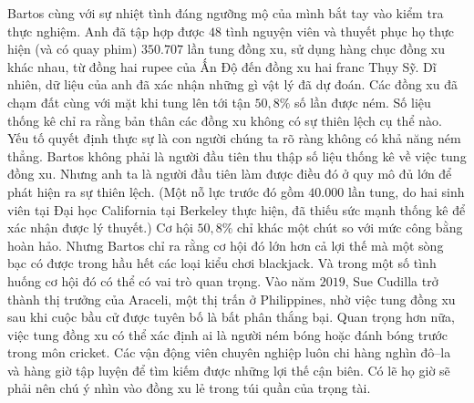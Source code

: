 \begin{multicols}{2}
	\vskip 0.1cm
	Bartos cùng với sự nhiệt tình đáng ngưỡng mộ của mình bắt tay vào kiểm tra thực nghiệm. Anh đã tập hợp được $48$ tình nguyện viên và thuyết phục họ thực hiện (và có quay phim) $350{.}707$ lần tung đồng xu, sử dụng hàng chục đồng xu khác nhau, từ đồng hai rupee của Ấn Độ đến đồng xu hai franc Thụy Sỹ. Dĩ nhiên, dữ liệu của anh  đã xác nhận những gì vật lý đã dự đoán. Các đồng xu đã chạm đất cùng với mặt khi tung lên tới tận $50,8\%$ số lần được ném.
	\vskip 0.1cm
	Số liệu thống kê chỉ ra rằng bản thân các đồng xu không có sự thiên lệch cụ thể nào. Yếu tố quyết định thực sự là con người chúng ta rõ ràng không có khả năng ném thẳng.  Bartos không phải là người đầu tiên thu thập số liệu thống kê về việc tung đồng xu. Nhưng anh ta là người đầu tiên làm được điều đó ở quy mô đủ lớn để phát hiện ra sự thiên lệch. (Một nỗ lực trước đó gồm $40{.}000$ lần tung, do hai sinh viên tại Đại học California tại Berkeley  thực hiện, đã thiếu sức mạnh thống kê để xác nhận được  lý thuyết.)
	\vskip 0.1cm
	Cơ hội $50,8\%$ chỉ khác một chút so với mức công bằng hoàn hảo. Nhưng  Bartos chỉ ra rằng cơ hội đó lớn hơn cả  lợi thế mà một sòng bạc có được trong hầu hết các loại kiểu chơi blackjack. Và trong một số tình huống cơ hội đó có thể có vai trò quan trọng. Vào năm $2019$, Sue Cudilla trở thành thị trưởng của Araceli, một thị trấn ở Philippines, nhờ việc tung đồng xu sau khi cuộc bầu cử được tuyên bố là bất phân thắng bại. Quan trọng hơn nữa, việc tung đồng xu có thể xác định ai là người ném bóng hoặc đánh bóng trước trong môn cricket. Các vận động viên chuyên nghiệp luôn chi hàng nghìn đô--la  và hàng giờ tập luyện để tìm kiếm được những lợi thế cận biên. Có lẽ họ giờ  sẽ phải nên chú ý nhìn vào đồng xu lẻ trong túi quần của trọng tài.
\end{multicols}